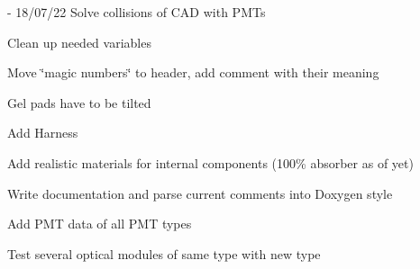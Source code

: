 \begin{DoxyRefList}
\item[File \mbox{\hyperlink{_o_m_sim_l_o_m18_8cc}{OMSim\+LOM18.cc}} ]\label{todo__todo000006}%
%
-\/ 18/07/22 Solve collisions of CAD with PMTs
\begin{DoxyItemize}
\item Clean up needed variables
\item Move \char`\"{}magic numbers\char`\"{} to header, add comment with their meaning
\item Gel pads have to be tilted
\item Add Harness
\item Add realistic materials for internal components (100\% absorber as of yet)
\item Write documentation and parse current comments into Doxygen style  
\end{DoxyItemize}
\item[Member \mbox{\hyperlink{class_o_m_sim_p_m_t_response_a0dd544847ff216a24aa8c528e76c9aed}{OMSim\+PMTResponse\+::create\+Histogram\+From\+Data}} (const std\+::string \&p\+File\+Path, const char $\ast$p\+TH2\+DName)]\label{todo__todo000001}%
%
Add PMT data of all PMT types  
\item[Member \mbox{\hyperlink{class_o_m_sim_sensitive_detector_a4f8fb54b28c422464b26e05a6cfa579b}{OMSim\+Sensitive\+Detector\+::m\+Boundary\+Process}} ]\label{todo__todo000002}%
%
Test several optical modules of same type with new type 
\end{DoxyRefList}